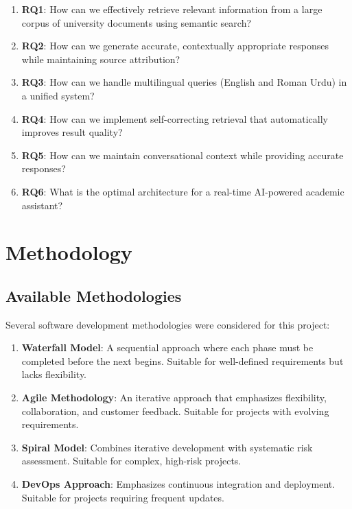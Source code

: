 \documentclass[12pt,a4paper]{book}
\numberwithin{table}{chapter}
\numberwithin{figure}{chapter}
\numberwithin{equation}{chapter}
\begin{document}
\begin{enumerate}
    \item \textbf{RQ1}: How can we effectively retrieve relevant information from a large corpus of university documents using semantic search?

    \item \textbf{RQ2}: How can we generate accurate, contextually appropriate responses while maintaining source attribution?

    \item \textbf{RQ3}: How can we handle multilingual queries (English and Roman Urdu) in a unified system?

    \item \textbf{RQ4}: How can we implement self-correcting retrieval that automatically improves result quality?

    \item \textbf{RQ5}: How can we maintain conversational context while providing accurate responses?

    \item \textbf{RQ6}: What is the optimal architecture for a real-time AI-powered academic assistant?
\end{enumerate}

\section{Methodology}

\subsection{Available Methodologies}

Several software development methodologies were considered for this project:

\begin{enumerate}
    \item \textbf{Waterfall Model}: A sequential approach where each phase must be completed before the next begins. Suitable for well-defined requirements but lacks flexibility.

    \item \textbf{Agile Methodology}: An iterative approach that emphasizes flexibility, collaboration, and customer feedback. Suitable for projects with evolving requirements.

    \item \textbf{Spiral Model}: Combines iterative development with systematic risk assessment. Suitable for complex, high-risk projects.

    \item \textbf{DevOps Approach}: Emphasizes continuous integration and deployment. Suitable for projects requiring frequent updates.
\end{enumerate}
\end{document}
